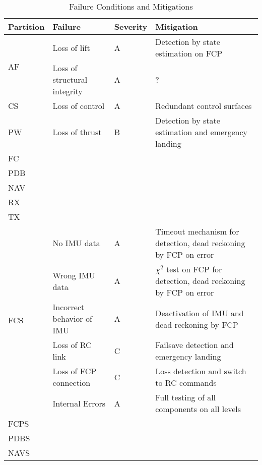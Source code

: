 \begin{table}[H]
    \centering
    \begin{tabular}{l|l|l|p{5.6cm}}
        \toprule
        Partition & Failure & Severity & Mitigation \\
        \midrule
        \multirow{2}{*}{AF} 
        & Loss of lift & A & Detection by state estimation on FCP \\
        & Loss of structural integrity & A & ? \\
        CS 
        & Loss of control & A & Redundant control surfaces \\
        PW 
        & Loss of thrust & B & Detection by state estimation and emergency landing \\
        \midrule
        FC \\
        PDB \\
        NAV \\
        RX \\
        TX \\
        \midrule
        \multirow{6}{*}{FCS}
        & No IMU data & A & Timeout mechanism for detection, dead reckoning by FCP on error \\
        & Wrong IMU data & A & $\chi^2$ test on FCP for detection, dead reckoning by FCP on error \\
        & Incorrect behavior of IMU & A & Deactivation of IMU and dead reckoning by FCP \\
        & Loss of RC link & C & Failsave detection and emergency landing \\
        & Loss of FCP connection & C & Loss detection and switch to RC commands \\
        & Internal Errors & A & Full testing of all components on all levels \\
        FCPS \\
        PDBS \\
        NAVS \\
        \bottomrule
    \end{tabular}
    \caption{Failure Conditions and Mitigations}
    \label{tab:03:failure}
\end{table}